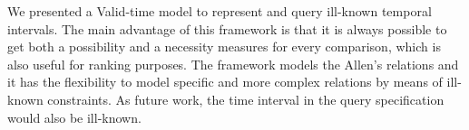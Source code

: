 We presented a Valid-time model to represent and query ill-known temporal intervals. The main advantage of this framework is that it is always possible to get both a possibility and a necessity measures for every comparison, which is also useful for ranking purposes. The framework models the Allen's relations and it has the flexibility to model specific and more complex relations by means of ill-known constraints.  As future work, the time interval in the query specification would also be ill-known.